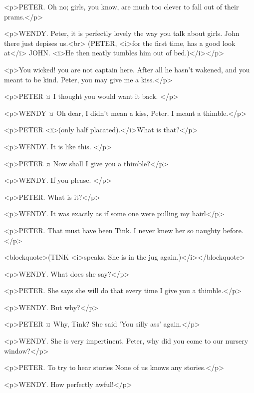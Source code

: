 <p>PETER. Oh no; girls, you know, are much too clever to fall out of their prams.</p>

<p>WENDY. Peter, it is perfectly lovely the way you talk about girls. John there just depises us.<br> (PETER, <i>for the first time, has a good look at</i> JOHN. <i>He then neatly tumbles him out of bed.)</i></p>

<p>You wicked! you are not captain here.
After all he hasn't wakened, and you meant to be kind.
Peter, you may give me a kiss.</p>

<p>PETER ¤
I thought you would want it back.
</p>

<p>WENDY ¤
Oh dear, I didn't mean a kiss, Peter. I meant a thimble.</p>

<p>PETER <i>(only half placated).</i>What is that?</p>

<p>WENDY. It is like this.
</p>

<p>PETER ¤
Now shall I give you a thimble?</p>

<p>WENDY. If you please.
</p>

<p>PETER. What is it?</p>

<p>WENDY. It was exactly as if some one were pulling my hairl</p>

<p>PETER. That must have been Tink. I never knew her so naughty before.</p>

<blockquote>(TINK <i>speaks. She is in the jug again.)</i></blockquote>

<p>WENDY. What does she say?</p>

<p>PETER. She says she will do that every time I give you a thimble.</p>

<p>WENDY. But why?</p>

<p>PETER ¤
Why, Tink?
She said 'You silly ass' again.</p>

<p>WENDY. She is very impertinent.
Peter, why did you come to our nursery window?</p>

<p>PETER. To try to hear stories None of us knows any stories.</p>

<p>WENDY. How perfectly awful!</p>

